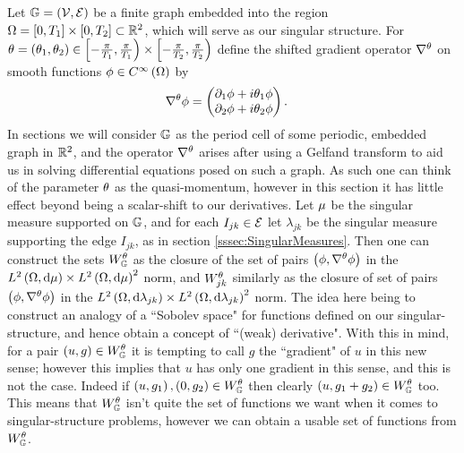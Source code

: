 Let $\mathbb{G}=\left( \mathcal{V},\mathcal{E} \right)$ be a finite graph embedded into the region $\Omega=\left[ 0,T_1 \right]\times\left[ 0,T_2 \right]\subset\mathbb{R}^2$, which will serve as our singular structure.
For $\theta=\left( \theta_1,\theta_2 \right)\in\left[-\frac{\pi}{T_1},\frac{\pi}{T_1}\right)\times\left[-\frac{\pi}{T_2},\frac{\pi}{T_2}\right)$ define the shifted gradient operator $\nabla^{\theta}$ on smooth functions $\phi\in C^{\infty}\left( \Omega \right)$ by
\begin{align*}
	\nabla^{\theta}\phi &= \begin{pmatrix} \partial_1\phi + i\theta_1\phi \\ \partial_2\phi + i\theta_2\phi \end{pmatrix}.
\end{align*}
In sections  we will consider $\mathbb{G}$ as the period cell of some periodic, embedded graph in $\mathbb{R}^2$, and the operator $\nabla^{\theta}$ arises after using a Gelfand transform to aid us in solving differential equations posed on such a graph.
As such one can think of the parameter $\theta$ as the quasi-momentum, however in this section it has little effect beyond being a scalar-shift to our derivatives.
Let $\mu$ be the singular measure supported on $\mathbb{G}$, and for each $I_{jk}\in \mathcal{E}$ let $\lambda_{jk}$ be the singular measure supporting the edge $I_{jk}$, as in section \ref{sssec:SingularMeasures}.
Then one can construct the sets $W^{\theta}_{\mathbb{G}}$ as the closure of the set of pairs $\left( \phi, \nabla^{\theta}\phi \right)$ in the $L^{2}\left( \Omega,\mathrm{d}\mu \right)\times L^{2}\left( \Omega,\mathrm{d}\mu \right)^2$ norm, and $W^{\theta}_{jk}$ similarly as the closure of set of pairs $\left( \phi, \nabla^{\theta}\phi \right)$ in the $L^{2}\left( \Omega,\mathrm{d}\lambda_{jk} \right)\times L^{2}\left( \Omega,\mathrm{d}\lambda_{jk} \right)^2$ norm.
The idea here being to construct an analogy of a ``Sobolev space" for functions defined on our singular-structure, and hence obtain a concept of ``(weak) derivative".
With this in mind, for a pair $\left( u,g \right)\in W^{\theta}_{\mathbb{G}}$ it is tempting to call $g$ the ``gradient" of $u$ in this new sense; however this implies that $u$ has only one gradient in this sense, and this is not the case.
Indeed if $\left( u,g_1 \right),\left( 0,g_2 \right)\in W^{\theta}_{\mathbb{G}}$ then clearly $\left( u, g_1+g_2 \right)\in W^{\theta}_{\mathbb{G}}$ too.
This means that $W^{\theta}_{\mathbb{G}}$ isn't quite the set of functions we want when it comes to singular-structure problems, however we can obtain a usable set of functions from $W^{\theta}_{\mathbb{G}}$. \newline

